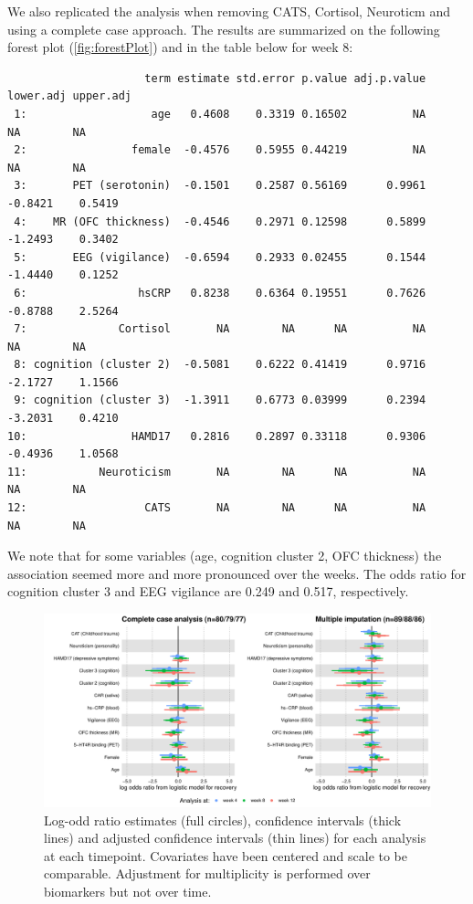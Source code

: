 \documentclass[12pt]{article}
\begin{document}
\clearpage

We also replicated the analysis when removing CATS, Cortisol,
Neuroticm and using a complete case approach. The results are
summarized on the following forest plot (\autoref{fig:forestPlot}) and in the table below for week 8:
\label{}
\begin{verbatim}
                     term estimate std.error p.value adj.p.value lower.adj upper.adj
 1:                   age   0.4608    0.3319 0.16502          NA        NA        NA
 2:                female  -0.4576    0.5955 0.44219          NA        NA        NA
 3:       PET (serotonin)  -0.1501    0.2587 0.56169      0.9961   -0.8421    0.5419
 4:    MR (OFC thickness)  -0.4546    0.2971 0.12598      0.5899   -1.2493    0.3402
 5:       EEG (vigilance)  -0.6594    0.2933 0.02455      0.1544   -1.4440    0.1252
 6:                 hsCRP   0.8238    0.6364 0.19551      0.7626   -0.8788    2.5264
 7:              Cortisol       NA        NA      NA          NA        NA        NA
 8: cognition (cluster 2)  -0.5081    0.6222 0.41419      0.9716   -2.1727    1.1566
 9: cognition (cluster 3)  -1.3911    0.6773 0.03999      0.2394   -3.2031    0.4210
10:                HAMD17   0.2816    0.2897 0.33118      0.9306   -0.4936    1.0568
11:           Neuroticism       NA        NA      NA          NA        NA        NA
12:                  CATS       NA        NA      NA          NA        NA        NA
\end{verbatim}

We note that for some variables (age, cognition cluster 2, OFC
thickness) the association seemed more and more pronounced over the
weeks. The odds ratio for cognition cluster 3 and EEG vigilance are
0.249 and 0.517, respectively.

\begin{figure}[!h]
\centering
\includegraphics[trim={0 0 0 0},width=\textwidth]{./../figures/gg-forestplot-OR.pdf}
\caption{\label{fig:forestPlot}Log-odd ratio estimates (full circles), confidence intervals (thick lines) and adjusted confidence intervals (thin lines) for each analysis at each timepoint. Covariates have been centered and scale to be comparable. Adjustment for multiplicity is performed over biomarkers but not over time.}
\end{figure}
\end{document}
